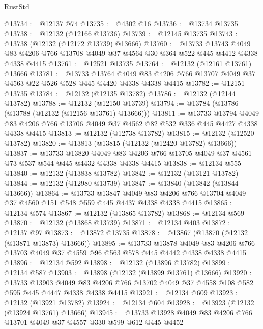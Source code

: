 \begin{lexlean}{RustStd}
\begin{coremodule}
{\begin{coremodule}
{{{{{{{{{{{{{{{{{{{{{{{{{{{{{{{{{{{{{{{{{{{{{{{{{{@13734 := @12137 @74
@13735 := @4302 @16
@13736 := @13734 @13735
@13738 := @12132 (@12166 @13736)
@13739 := @12145 @13735
@13743 := @13738 (@12132 (@12172 @13739) @13666)
@13760 := @13733
    @13743
    @4049
    @83
    @4206
    @766
    @13708
    @4049
    @37
    @4564
    @30
    @364
    @522
    @445
    @4412
    @4338
    @4338
    @4415
@13761 := @12521 @13735
@13764 := @12132 (@12161 @13761) @13666
@13781 := @13733
    @13764
    @4049
    @83
    @4206
    @766
    @13707
    @4049
    @37
    @4563
    @22
    @526
    @528
    @445
    @4420
    @4338
    @4338
    @4415
@13782 := @12151 @13735
@13784 := @12132 (@12135 @13782)
@13786 := @12132 (@12144 @13782)
@13788 := @12132 (@12150 @13739)
@13794 := @13784 (@13786 (@13788 (@12132 (@12156 @13761) @13666)))
@13811 := @13733
    @13794
    @4049
    @83
    @4206
    @766
    @13706
    @4049
    @37
    @4562
    @82
    @532
    @336
    @445
    @4427
    @4338
    @4338
    @4415
@13813 := @12132 (@12738 @13782)
@13815 := @12132 (@12520 @13782)
@13820 := @13813 (@13815 (@12132 (@12420 @13782) @13666))
@13837 := @13733
    @13820
    @4049
    @83
    @4206
    @766
    @13705
    @4049
    @37
    @4561
    @73
    @537
    @544
    @445
    @4432
    @4338
    @4338
    @4415
@13838 := @12134 @555
@13840 := @12132 (@13838 @13782)
@13842 := @12132 (@13121 @13782)
@13844 := @12132 (@12980 @13739)
@13847 := @13840 (@13842 (@13844 @13666))
@13864 := @13733
    @13847
    @4049
    @83
    @4206
    @766
    @13704
    @4049
    @37
    @4560
    @151
    @548
    @559
    @445
    @4437
    @4338
    @4338
    @4415
@13865 := @12134 @574
@13867 := @12132 (@13865 @13782)
@13868 := @12134 @569
@13870 := @12132 (@13868 @13739)
@13871 := @12134 @403
@13872 := @12137 @97
@13873 := @13872 @13735
@13878 := @13867 (@13870 (@12132 (@13871 @13873) @13666))
@13895 := @13733
    @13878
    @4049
    @83
    @4206
    @766
    @13703
    @4049
    @37
    @4559
    @96
    @563
    @578
    @445
    @4442
    @4338
    @4338
    @4415
@13896 := @12134 @592
@13898 := @12132 (@13896 @13782)
@13899 := @12134 @587
@13903 := @13898 (@12132 (@13899 @13761) @13666)
@13920 := @13733
    @13903
    @4049
    @83
    @4206
    @766
    @13702
    @4049
    @37
    @4558
    @108
    @582
    @595
    @445
    @4447
    @4338
    @4338
    @4415
@13921 := @12134 @609
@13923 := @12132 (@13921 @13782)
@13924 := @12134 @604
@13928 := @13923 (@12132 (@13924 @13761) @13666)
@13945 := @13733
    @13928
    @4049
    @83
    @4206
    @766
    @13701
    @4049
    @37
    @4557
    @330
    @599
    @612
    @445
    @4452
}}}}}}}}}}}}}}}}}}}}}}}}}}}}}}}}}}}}}}}}}}}}}}}}}}
\end{coremodule}}
\end{coremodule}
\end{lexlean}
